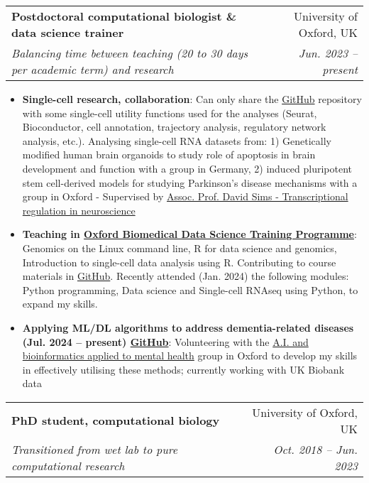 \documentclass{article}
\makeatletter
\newcommand{\resumeItem}[2]{
  \item\small{
    \textbf{#1}{: #2 \vspace{-2pt}}
  }
}
\newcommand{\resumeSubheading}[4]{
  \vspace{-1pt}\item
    \begin{tabular*}{0.97\textwidth}[t]{l@{\extracolsep{\fill}}r}
      \textbf{#1} & #2 \\
      \textit{\small#3} & \textit{\small #4} \\
    \end{tabular*}\vspace{-5pt}
}
\newcommand{\resumeItemListStart}{\begin{itemize}}
\newcommand{\resumeItemListEnd}{\end{itemize}\vspace{-5pt}}
\makeatother
\begin{document}
        \resumeSubheading
        {Postdoctoral computational biologist \& data science trainer}{University of Oxford, UK}{Balancing time between teaching (20 to 30 days per academic term) and research}{Jun. 2023 -- present}
            \resumeItemListStart
                \resumeItem{Single-cell research, collaboration} {Can only share the \href{https://github.com/liezeltamon/utils/tree/main/R}{GitHub} repository with some single-cell utility functions used for the analyses (Seurat, Bioconductor, cell annotation, trajectory analysis, regulatory network analysis, etc.). Analysing single-cell RNA datasets from: 1) Genetically modified human brain organoids to study role of apoptosis in brain development and function with a group in Germany, 2) induced pluripotent stem cell-derived models for studying Parkinson's disease mechanisms with a group in Oxford - Supervised by \href{https://www.rdm.ox.ac.uk/people/david-sims}{Assoc. Prof. David Sims - Transcriptional regulation in neuroscience}}
                \resumeItem{Teaching in \href{https://www.imm.ox.ac.uk/research/units-and-centres/mrc-wimm-centre-for-computational-biology/training/oxford-biomedical-data-science-training-programme}{Oxford Biomedical Data Science Training Programme}}{Genomics on the Linux command line, R for data science and genomics, Introduction to single-cell data analysis using R. Contributing to course materials in {\href{https://github.com/kevinrue/OBDS_slides}{GitHub}}. Recently attended (Jan. 2024) the following modules: Python programming, Data science and Single-cell RNAseq using Python, to expand my skills.}
                 \resumeItem{Applying ML/DL algorithms to address dementia-related diseases (Jul. 2024 -- present) \href{https://github.com/liezeltamon/ml-wearable-data}{GitHub}}{Volunteering with the \href{https://www.psych.ox.ac.uk/team/alejo-nevado-holgado}{A.I. and bioinformatics applied to mental health} group in Oxford to develop my skills in effectively utilising these methods; currently working with UK Biobank data}
            \resumeItemListEnd
        \resumeSubheading
        {PhD student, computational biology}{University of Oxford, UK}{Transitioned from wet lab to pure computational research}{Oct. 2018 -- Jun. 2023}
\end{document}
